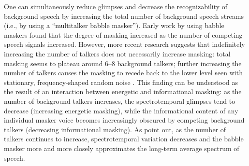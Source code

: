 One can simultaneously reduce glimpses and decrease the recognizability of background speech by increasing the total number of background speech streams (i.e., by using a “multitalker babble masker”).  Early work by \citet{Miller1947} using babble maskers found that the degree of masking increased as the number of competing speech signals increased.  However, more recent research suggests that indefinitely increasing the number of talkers does not necessarily increase masking: total masking seems to plateau around 6–8 background talkers; further increasing the number of talkers causes the masking to recede back to the lower level seen with stationary, frequency-shaped random noise \citep{BrungartEtAl2001,SimpsonCooke2005}.  This finding can be understood as the result of an interaction between energetic and informational masking: %
as the number of background talkers increases, the spectrotemporal glimpses tend to decrease (increasing energetic masking), while the informational content of any individual masker voice becomes increasingly obscured by competing background talkers (decreasing informational masking).  %
As \citeauthor{SimpsonCooke2005} point out, as the number of talkers continues to increase, spectrotemporal variation decreases and the babble masker more and more closely approximates the long-term average spectrum of speech.

